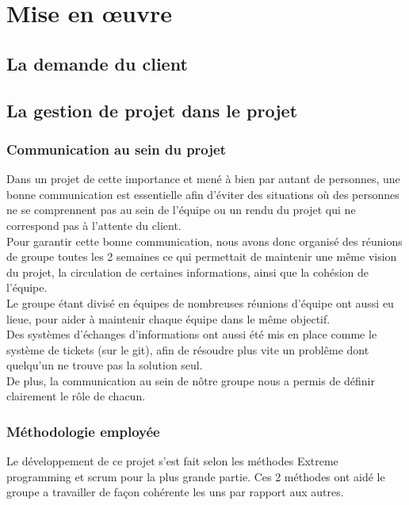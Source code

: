 \chapter{Mise en œuvre}
\section{La demande du client}


\section{La gestion de projet dans le projet}

\subsection{Communication au sein du projet}

Dans un projet de cette importance et mené à bien par autant de personnes, une bonne communication est essentielle afin d'éviter des situations où des personnes ne se comprennent pas au sein de l'équipe ou un rendu du projet qui ne correspond pas à l'attente du client.\\

Pour garantir cette bonne communication, nous avons donc organisé des réunions de groupe toutes les 2 semaines ce qui permettait de maintenir une même vision du projet, la circulation de certaines informations, ainsi que la cohésion de l'équipe.\\
Le groupe étant divisé en équipes de nombreuses réunions d'équipe ont aussi eu lieue, pour aider à maintenir chaque équipe dans le même objectif.\\

Des systèmes d'échanges d'informations ont aussi été mis en place comme le système de tickets (sur le git), afin de résoudre plus vite un problême dont quelqu'un ne trouve pas la solution seul.\\

De plus, la communication au sein de nôtre groupe nous a permis de définir clairement le rôle de chacun.

\subsection{Méthodologie employée}

Le développement de ce projet s'est fait selon les méthodes Extreme programming et scrum pour la plus grande partie. Ces 2 méthodes ont aidé le groupe a travailler de façon cohérente les uns par rapport aux autres.\\

